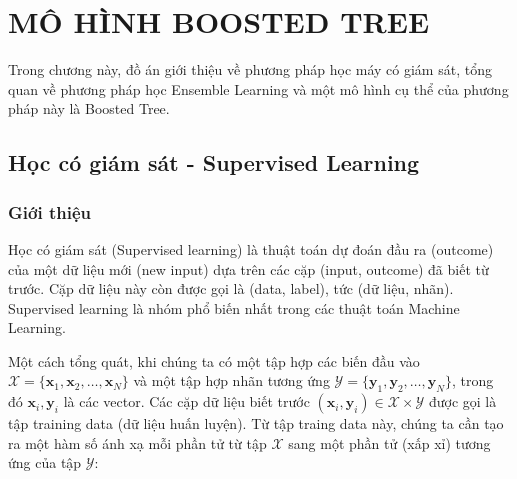 \pagestyle{plain}
\graphicspath{{Chapter2/Figs/Raster/}{Chapter2/Figs/}}
\chapter{MÔ HÌNH BOOSTED TREE}
Trong chương này, đồ án giới thiệu về phương pháp học máy có giám sát, tổng quan về phương pháp học Ensemble Learning và một mô hình cụ thể của phương pháp này là Boosted Tree.
\section{Học có giám sát - Supervised Learning}
\subsection{Giới thiệu}
Học có giám sát (Supervised learning) là thuật toán dự đoán đầu ra (outcome) của một dữ liệu mới (new input) dựa trên các cặp (input, outcome) đã biết từ trước. Cặp dữ liệu này còn được gọi là (data, label), tức (dữ liệu, nhãn). Supervised learning là nhóm phổ biến nhất trong các thuật toán Machine Learning.

Một cách tổng quát, khi chúng ta có một tập hợp các biến đầu vào \( \mathcal{X} = \{\mathbf{x}_1, \mathbf{x}_2, \dots, \mathbf{x}_N\} \) và một tập hợp nhãn tương ứng \( \mathcal{Y} = \{\mathbf{y}_1, \mathbf{y}_2, \dots, \mathbf{y}_N\} \), trong đó \( \mathbf{x}_i, \mathbf{y}_i \) là các vector. 
Các cặp dữ liệu biết trước \( (\mathbf{x}_i, \mathbf{y}_i) \in \mathcal{X} \times \mathcal{Y} \) được gọi là tập training data (dữ liệu huấn luyện). Từ tập traing data này, chúng ta cần tạo ra một hàm số ánh xạ mỗi phần tử từ tập \(\mathcal{X}\) sang một phần tử (xấp xỉ) tương ứng của tập \(\mathcal{Y}\):

